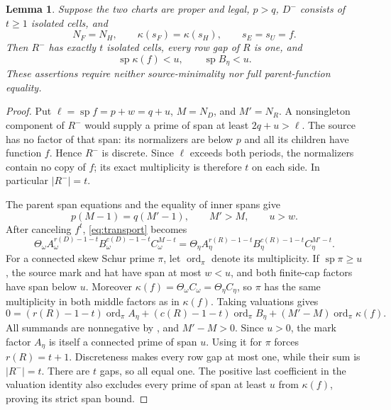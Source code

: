 \documentclass[11pt,a4paper]{amsart}
\numberwithin{equation}{section}
\theoremstyle{plain}
\newtheorem{lemma}[theorem]{Lemma}
\theoremstyle{definition}
\begin{document}
\begin{lemma}\label{lem:alpha-row-candidate}
Suppose the two charts are proper and legal, \(p>q\), \(D^-\) consists of \(t\ge1\) isolated cells, and
\begin{equation*}
 N_F=N_H,\qquad \kappa(s_F)=\kappa(s_H),\qquad s_E=s_U=f.
\end{equation*}
Then \(R^-\) has exactly \(t\) isolated cells, every row gap of \(R\) is one, and
\begin{equation*}
 \operatorname{sp}\kappa(f)<u,\qquad
 \operatorname{sp}B_\eta<u.
\end{equation*}
These assertions require neither source-minimality nor full parent-function equality.
\end{lemma}
\begin{proof}
Put \(\ell=\operatorname{sp}f=p+w=q+u\), \(M=N_D\), and \(M'=N_R\).  A nonsingleton component of \(R^-\) would supply a prime of span at least \(2q+u>\ell\).  The source has no factor of that span: its normalizers are below \(p\) and all its children have function \(f\).  Hence \(R^-\) is discrete.  Since \(\ell\) exceeds both periods, the normalizers contain no copy of \(f\); its exact multiplicity is therefore \(t\) on each side.  In particular \(|R^-|=t\).

The parent span equations and the equality of inner spans give
\begin{equation*}
 p(M-1)=q(M'-1),\qquad M'>M,\qquad u>w.
\end{equation*}
After canceling \(f^t\), \eqref{eq:transport} becomes
\begin{equation*}
 \Theta_\omega A_\omega^{r(D)-1-t}B_\omega^{c(D)-1-t}C_\omega^{M-t}
 =\Theta_\eta A_\eta^{r(R)-1-t}B_\eta^{c(R)-1-t}C_\eta^{M'-t}.
\end{equation*}
For a connected skew Schur prime \(\pi\), let \(\operatorname{ord}_\pi\) denote its multiplicity.  If \(\operatorname{sp}\pi\ge u\), the source mark and hat have span at most \(w<u\), and both finite-cap factors have span below \(u\).  Moreover \(\kappa(f)=\Theta_\omega C_\omega=\Theta_\eta C_\eta\), so \(\pi\) has the same multiplicity in both middle factors as in \(\kappa(f)\).  Taking valuations gives
\begin{equation*}
 0=(r(R)-1-t)\operatorname{ord}_\pi A_\eta
  +(c(R)-1-t)\operatorname{ord}_\pi B_\eta
  +(M'-M)\operatorname{ord}_\pi\kappa(f).
\end{equation*}
All summands are nonnegative by , and \(M'-M>0\).  Since \(u>0\), the mark factor \(A_\eta\) is itself a connected prime of span \(u\).  Using it for \(\pi\) forces \(r(R)=t+1\).  Discreteness makes every row gap at most one, while their sum is \(|R^-|=t\).  There are \(t\) gaps, so all equal one.  The positive last coefficient in the valuation identity also excludes every prime of span at least \(u\) from \(\kappa(f)\), proving its strict span bound.


\end{proof}
\end{document}
